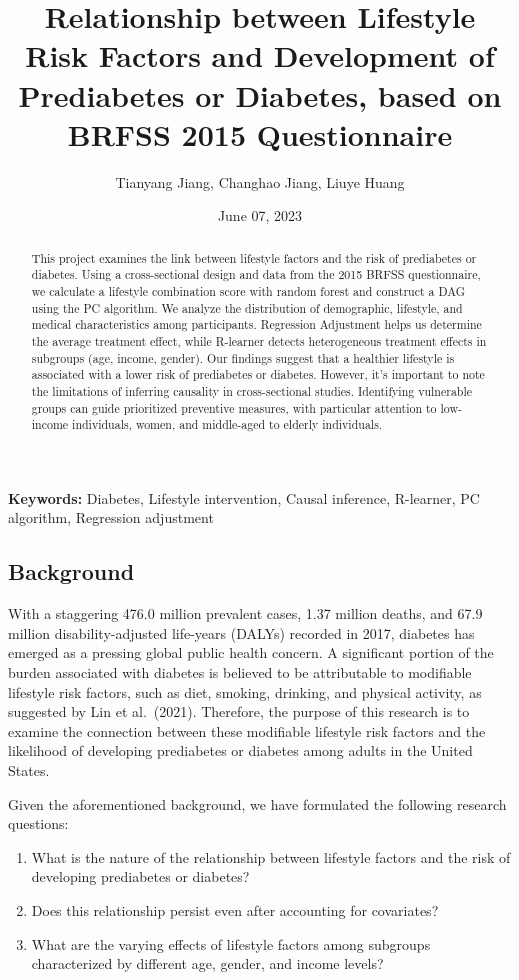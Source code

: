 \documentclass[
  12pt,
]{article}
\title{Relationship between Lifestyle Risk Factors and Development of
Prediabetes or Diabetes, based on BRFSS 2015 Questionnaire}
\author{Tianyang Jiang, Changhao Jiang, Liuye Huang}
\date{June 07, 2023}
\begin{document}
\maketitle
\begin{abstract}
This project examines the link between lifestyle factors and the risk of
prediabetes or diabetes. Using a cross-sectional design and data from
the 2015 BRFSS questionnaire, we calculate a lifestyle combination score
with random forest and construct a DAG using the PC algorithm. We
analyze the distribution of demographic, lifestyle, and medical
characteristics among participants. Regression Adjustment helps us
determine the average treatment effect, while R-learner detects
heterogeneous treatment effects in subgroups (age, income, gender). Our
findings suggest that a healthier lifestyle is associated with a lower
risk of prediabetes or diabetes. However, it's important to note the
limitations of inferring causality in cross-sectional studies.
Identifying vulnerable groups can guide prioritized preventive measures,
with particular attention to low-income individuals, women, and
middle-aged to elderly individuals.
\end{abstract}

\textbf{Keywords:} Diabetes, Lifestyle intervention, Causal inference,
R-learner, PC algorithm, Regression adjustment

\hypertarget{background}{%
\subsection{Background}\label{background}}

With a staggering 476.0 million prevalent cases, 1.37 million deaths,
and 67.9 million disability-adjusted life-years (DALYs) recorded in
2017, diabetes has emerged as a pressing global public health concern. A
significant portion of the burden associated with diabetes is believed
to be attributable to modifiable lifestyle risk factors, such as diet,
smoking, drinking, and physical activity, as suggested by Lin et
al.~(2021). Therefore, the purpose of this research is to examine the
connection between these modifiable lifestyle risk factors and the
likelihood of developing prediabetes or diabetes among adults in the
United States.

Given the aforementioned background, we have formulated the following
research questions:

\begin{enumerate}
\def\labelenumi{\arabic{enumi}.}
\item
  What is the nature of the relationship between lifestyle factors and
  the risk of developing prediabetes or diabetes?
\item
  Does this relationship persist even after accounting for covariates?
\item
  What are the varying effects of lifestyle factors among subgroups
  characterized by different age, gender, and income levels?
\end{enumerate}
\end{document}
